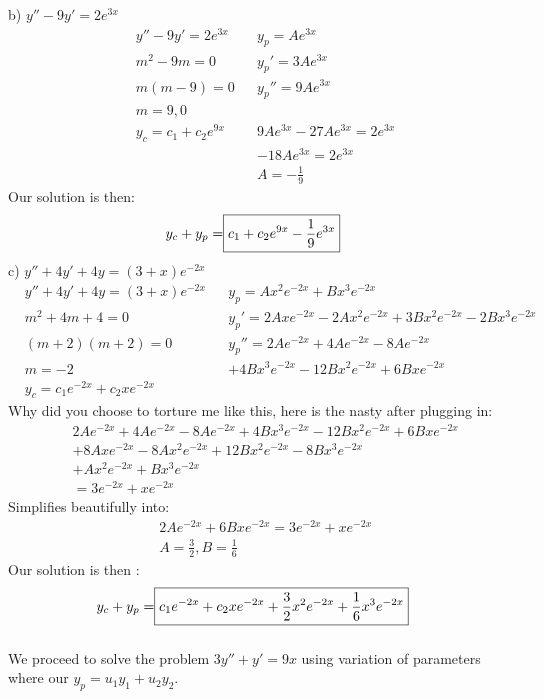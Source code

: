 \documentclass{article}
\begin{document}
b) $ y'' - 9y' = 2e^{3x }$
\begin{align*}
    & y'' - 9y' = 2e^{3x} && y_p = Ae^{3x}\\
    & m^2 - 9m = 0 && y_p' = 3Ae^{3x}\\
    & m(m-9) = 0 && y_p'' = 9Ae^{3x} \\
    & m = 9, 0 \\
    & y_c = c_1 + c_2e^{9x} && 9Ae^{3x} - 27Ae^{3x} = 2e^{3x} \\
    &&& -18Ae^{3x} = 2e^{3x} \\
    &&& A = -\frac{1}{9}
\end{align*}
Our solution is then:
\begin{align*}
    y_c + y_p = \Aboxed{c_1 + c_2e^{9x} - \frac{1}{9}e^{3x}}
\end{align*}
c) $ y'' + 4y' + 4y = (3+x)e^{-2x}$
\begin{align*}
    & y'' + 4y' + 4y = (3+x)e^{-2x} && y_p = Ax^2e^{-2x} + Bx^3e^{-2x}\\
    & m^2 + 4m + 4 = 0 && y_p' = 2Axe^{-2x} - 2Ax^2e^{-2x} + 3Bx^2e^{-2x} - 2Bx^3e^{-2x} \\
    & (m+2)(m+2) = 0 && y_p''= 2Ae^{-2x} + 4Ae^{-2x} - 8Ae^{-2x}\\
    & m = -2 && +4Bx^3e^{-2x} - 12Bx^2e^{-2x} + 6Bxe^{-2x} \\
    & y_c = c_1e^{-2x} + c_2xe^{-2x}
\end{align*}
Why did you choose to torture me like this, here is the nasty after plugging in:
\begin{align*}
    & 2Ae^{-2x} + 4Ae^{-2x} - 8Ae^{-2x} + 4Bx^3e^{-2x} - 12Bx^2e^{-2x} + 6Bxe^{-2x} \\
    & + 8Axe^{-2x} - 8Ax^2e^{-2x} + 12Bx^2e^{-2x} - 8Bx^3e^{-2x} \\
    & + Ax^2e^{-2x} + Bx^3e^{-2x} \\
    & = 3e^{-2x} + xe^{-2x}
\end{align*}
Simplifies beautifully into:
\begin{align*}
    & 2Ae^{-2x} + 6Bxe^{-2x} =  3e^{-2x} + xe^{-2x} \\
    & A = \frac{3}{2}, B = \frac{1}{6}
\end{align*}
Our solution is then :
\begin{align*}
    y_c + y_p = \Aboxed{c_1e^{-2x} + c_2xe^{-2x} + \frac{3}{2}x^2e^{-2x} + \frac{1}{6}x^3e^{-2x}}
\end{align*}

\setcounter{subsection}{6}
\setcounter{subsubsection}{0}
\subsubsection{}
We proceed to solve the problem $ 3y'' + y' = 9x $ using variation of parameters where our $ y_p = u_1y_1 + u_2y_2$.
\end{document}
